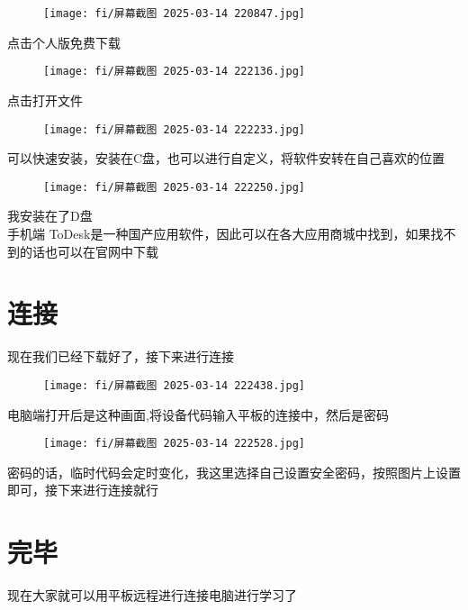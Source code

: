 \documentclass{article}
\begin{document}
\begin{figure}[h]
    \centering
    \texttt{[image: fi/屏幕截图 2025-03-14 220847.jpg]}
\end{figure} 
 \indent 点击个人版免费下载
 \begin{figure}[h]
    \centering
    \texttt{[image: fi/屏幕截图 2025-03-14 222136.jpg]}
\end{figure} 
\indent 点击打开文件
\begin{figure}[h]
    \centering
    \texttt{[image: fi/屏幕截图 2025-03-14 222233.jpg]}
\end{figure}
\indent 可以快速安装，安装在C盘，也可以进行自定义，将软件安转在自己喜欢的位置
\begin{figure}[h]
    \centering
    \texttt{[image: fi/屏幕截图 2025-03-14 222250.jpg]}
\end{figure}
\indent 我安装在了D盘
\\手机端
\indent ToDesk是一种国产应用软件，因此可以在各大应用商城中找到，如果找不到的话也可以在官网中下载
\section{连接}
现在我们已经下载好了，接下来进行连接
\begin{figure}[h]
    \centering
    \texttt{[image: fi/屏幕截图 2025-03-14 222438.jpg]}
\end{figure}
\indent 电脑端打开后是这种画面,将设备代码输入平板的连接中，然后是密码
\begin{figure}[h]
    \centering
    \texttt{[image: fi/屏幕截图 2025-03-14 222528.jpg]}
\end{figure}
\indent 密码的话，临时代码会定时变化，我这里选择自己设置安全密码，按照图片上设置即可，接下来进行连接就行
\section{完毕}
现在大家就可以用平板远程进行连接电脑进行学习了
\end{document}
